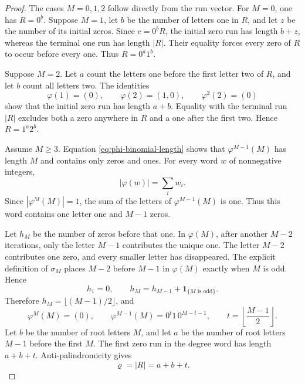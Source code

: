 \documentclass[10pt,a4paper]{amsart}
\begin{document}
\begin{proof}
The cases \(M=0,1,2\) follow directly from the run vector.  For
\(M=0\), one has \(R=0^b\).  Suppose \(M=1\), let \(b\) be the number of
letters one in \(R\), and let \(z\) be the number of its initial zeros.
Since \(c=0^bR\), the initial zero run has length \(b+z\), whereas the
terminal one run has length \(|R|\).  Their equality forces every zero of
\(R\) to occur before every one.  Thus \(R=0^a1^b\).

Suppose \(M=2\).  Let \(a\) count the letters one before the first letter two
of \(R\), and let \(b\) count all letters two.  The identities
\[
 \varphi(1)=(0),
 \qquad \varphi(2)=(1,0),
 \qquad \varphi^2(2)=(0)
\]
show that the initial zero run has length \(a+b\).  Equality with the
terminal run \(|R|\) excludes both a zero anywhere in \(R\) and a one after
the first two.  Hence \(R=1^a2^b\).

Assume \(M\geq3\).  Equation \eqref{eq:phi-binomial-length} shows that
\(\varphi^{M-1}(M)\) has length \(M\) and contains only zeros and ones.  For
every word \(w\) of nonnegative integers,
\[
 |\varphi(w)|=\sum_i w_i.
\]
Since \(|\varphi^M(M)|=1\), the sum of the letters of
\(\varphi^{M-1}(M)\) is one.  Thus this word contains one letter one and
\(M-1\) zeros.

Let \(h_M\) be the number of zeros before that one.  In \(\varphi(M)\), after
another \(M-2\) iterations, only the letter \(M-1\) contributes the unique
one.  The letter \(M-2\) contributes one zero, and every smaller letter has
disappeared.  The explicit definition of \(\sigma_M\) places \(M-2\) before
\(M-1\) in \(\varphi(M)\) exactly when \(M\) is odd.  Hence
\[
 h_1=0,
 \qquad
 h_M=h_{M-1}+\mathbf 1_{\{M\text{ is odd}\}}.
\]
Therefore \(h_M=\lfloor(M-1)/2\rfloor\), and
\begin{equation*}
 \varphi^M(M)=(0),
 \qquad
 \varphi^{M-1}(M)=0^t1\,0^{M-t-1},
 \qquad t=\left\lfloor\frac{M-1}{2}\right\rfloor.
\end{equation*}
Let \(b\) be the number of root letters \(M\), and let \(a\) be the number
of root letters \(M-1\) before the first \(M\).  The first zero run in the
degree word has length \(a+b+t\).  Anti-palindromicity gives
\begin{equation*}
 \varrho=|R|=a+b+t.
\end{equation*}


\end{proof}
\end{document}
